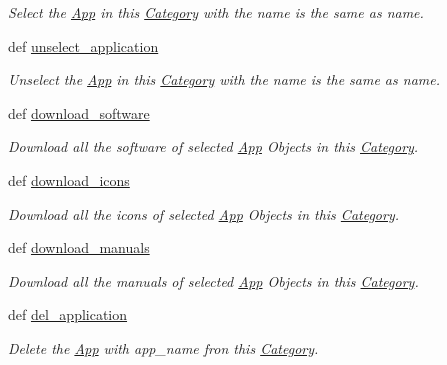 \begin{CompactItemize}
\begin{CompactList}\small\item\em Select the \hyperlink{classwinsollib_1_1App}{App} in this \hyperlink{classwinsollib_1_1Category}{Category} with the name is the same as {\em name\/}. \item\end{CompactList}\item 
def \hyperlink{classwinsollib_1_1Category_c6d6db9af6a3d8a62de9c77fe2f99569}{unselect\_\-application}
\begin{CompactList}\small\item\em Unselect the \hyperlink{classwinsollib_1_1App}{App} in this \hyperlink{classwinsollib_1_1Category}{Category} with the name is the same as {\em name\/}. \item\end{CompactList}\item 
def \hyperlink{classwinsollib_1_1Category_79faeb2396e62dd2b0a438cc980eea26}{download\_\-software}
\begin{CompactList}\small\item\em Download all the software of selected \hyperlink{classwinsollib_1_1App}{App} Objects in this \hyperlink{classwinsollib_1_1Category}{Category}. \item\end{CompactList}\item 
def \hyperlink{classwinsollib_1_1Category_0fa4e42d829a086c9cdabcd9a6fba56c}{download\_\-icons}
\begin{CompactList}\small\item\em Download all the icons of selected \hyperlink{classwinsollib_1_1App}{App} Objects in this \hyperlink{classwinsollib_1_1Category}{Category}. \item\end{CompactList}\item 
def \hyperlink{classwinsollib_1_1Category_b6f4c885fe37c82bdce86c0efef21af7}{download\_\-manuals}
\begin{CompactList}\small\item\em Download all the manuals of selected \hyperlink{classwinsollib_1_1App}{App} Objects in this \hyperlink{classwinsollib_1_1Category}{Category}. \item\end{CompactList}\item 
def \hyperlink{classwinsollib_1_1Category_1c980dbd591abfb16c9f39a7cfb1e437}{del\_\-application}
\begin{CompactList}\small\item\em Delete the \hyperlink{classwinsollib_1_1App}{App} with {\em app\_\-name\/} fron this \hyperlink{classwinsollib_1_1Category}{Category}. \item\end{CompactList}\item 

\end{CompactItemize}

